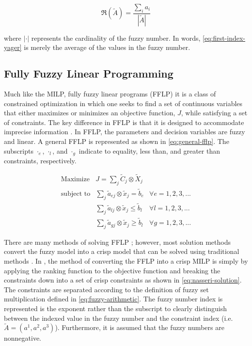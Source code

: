 \documentclass[11pt,a4paper,final]{article}
\begin{document}
\begin{equation}
\label{eq:first-index-yager}
\mathfrak{R}(\tilde{A}) = \frac{\sum_i a_i}{|\tilde{A}|}
\end{equation}

\noindent
where \(|\cdot|\) represents the cardinality of the fuzzy number. In words, \autoref{eq:first-index-yager} is merely the average
of the values in the fuzzy number.

\subsection{Fully Fuzzy Linear Programming}
\label{sec:org49d318d}
Much like the MILP, fully fuzzy linear programs (FFLP) it is a class of constrained optimization in which one seeks to
find a set of continuous variables that either maximizes or minimizes an objective function, \(J\), while satisfying a set
of constraints. The key difference in FFLP is that it is designed to accommodate imprecise information
\cite{bello-2019-fuzzy-activ,kaur-2016-introd-fuzzy}. In FFLP, the parameters and decision variables are fuzzy and
linear. A general FFLP is represented as shown in \autoref{eq:general-fflp}. The subscripts \(\cdot_e\), \(\cdot_l\), and \(\cdot_g\)
indicate to equality, less than, and greater than constraints, respectively.

\begin{equation}
\label{eq:general-fflp}
\begin{array}{lll}
\text{Maximize}   & J = \sum_j \tilde{C}_j \otimes \tilde{X}_j              &                 \\
\text{subject to} & \sum_j \tilde{a}_{ej} \otimes \tilde{x}_j = \tilde{b}_e &  \forall e = 1,2,3,... \\
                  & \sum_j \tilde{a}_{lj} \otimes \tilde{x}_j \le \tilde{b}_l &  \forall l = 1,2,3,... \\
                  & \sum_j \tilde{a}_{gj} \otimes \tilde{x}_j \ge \tilde{b}_l &  \forall g = 1,2,3,...
\end{array}
\end{equation}

There are many methods of solving FFLP
\cite{bello-2019-fuzzy-activ,kaur-2016-introd-fuzzy,ebrahimnejad-2016-new-method,nasseri-2013-fully}; however, most
solution methods convert the fuzzy model into a crisp model that can be solved using traditional methods
\cite{bello-2019-fuzzy-activ}. In \cite{nasseri-2013-fully,bello-2019-fuzzy-activ}, the method of converting the FFLP
into a crisp MILP is simply by applying the ranking function to the objective function and breaking the constraints down
into a set of crisp constraints as shown in \autoref{eq:nasseri-solution}. The constraints are separated according to the
definition of fuzzy set multiplication defined in \autoref{eq:fuzzy-arithmetic}. The fuzzy number index is represented is
the exponent rather than the subscript to clearly distinguish between the indexed value in the fuzzy number and the
constraint index (i.e. \(\tilde{A} = (a^1,a^2,a^3)\)). Furthermore, it is assumed that the fuzzy numbers are nonnegative.
\end{document}
